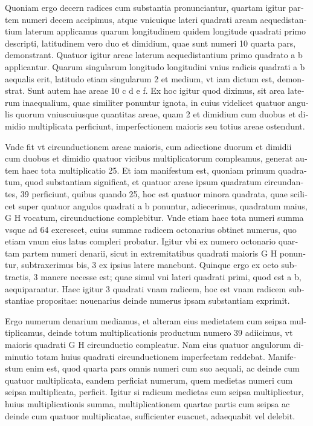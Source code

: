 \documentclass[11pt,a4paper]{book}
\begin{document}
\textlatin{Quoniam ergo decern radices cum substantia pronunciantur, quartam igitur partem numeri decem accipimus, atque vnicuique lateri quadrati aream aequedistantium laterum applicamus quarum longitudinem quidem longitude quadrati primo descripti, latitudinem vero duo et dimidium, quae sunt numeri 10 quarta pars, demonstrant. Quatuor igitur areae laterum aequedistantium primo quadrato a b applicantur. Quarum singularum longitudo longitudini vnius radicis quadrati a b aequalis erit, latitudo etiam singularum 2 et medium, vt iam dictum est, demonstrat. Sunt autem hae areae 10 c d e f. Ex hoc igitur quod diximus, sit area laterum inaequalium, quae similiter ponuntur ignota, in cuius videlicet quatuor angulis quorum vniuscuiusque quantitas areae, quam 2 et dimidium cum duobus et dimidio multiplicata perficiunt, imperfectionem maioris seu totius areae ostendunt.}

\textlatin{Vnde fit vt circunductionem areae maioris, cum adiectione duorum et dimidii cum duobus et dimidio quatuor vicibus multiplicatorum compleamus, generat autem haec tota multiplicatio 25. Et iam manifestum est, quoniam primum quadratum, quod substantiam significat, et quatuor areae ipsum quadratum circundantes, 39 perficiunt, quibus quando 25, hoc est quatuor minora quadrata, quae scilicet super quatuor angulos quadrati a b ponuntur, adiecerimus, quadratum maius, G H vocatum, circunductione complebitur. Vnde etiam haec tota numeri summa vsque ad 64 excrescet, cuius summae radicem octonarius obtinet numerus, quo etiam vnum eius latus compleri probatur. Igitur vbi ex numero octonario quartam partem numeri denarii, sicut in extremitatibus quadrati maioris G H ponuntur, subtraxerimus bis, 3 ex ipsius latere manebunt. Quinque ergo ex octo subtractis, 3 manere necesse est; quae simul vni lateri quadrati primi, quod est a b, aequiparantur. Haec igitur 3 quadrati vnam radicem, hoc est vnam radicem substantiae propositae: nouenarius deinde numerus ipsam substantiam exprimit.}

\textlatin{Ergo numerum denarium mediamus, et alteram eius medietatem cum seipsa multiplicamus, deinde totum multiplicationis productum numero 39 adiicimus, vt maioris quadrati G H circunductio compleatur. Nam eius quatuor angulorum diminutio totam huius quadrati circunductionem imperfectam reddebat. Manifestum enim est, quod quarta pars omnis numeri cum suo aequali, ac deinde cum quatuor multiplicata, eandem perficiat numerum, quem medietas numeri cum seipsa multiplicata, perficit. Igitur si radicum medietas cum seipsa multiplicetur, huius multiplicationis summa, multiplicationem quartae partis cum seipsa ac deinde cum quatuor multiplicatae, sufficienter euacuet, adaequabit vel delebit.}
\end{document}

